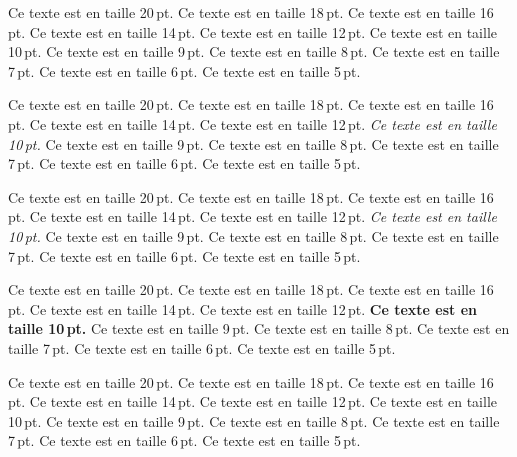 {\obeylines
{}\nopagebreak
{\twentyrm \fontss Ce texte est en taille 20\,pt.}
{\eighteenrm \fontss Ce texte est en taille 18\,pt.}
{\sixteenrm \fontss Ce texte est en taille 16\,pt.}
{\fourteenrm \fontss Ce texte est en taille 14\,pt.}
{\twelverm \fontss Ce texte est en taille 12\,pt.}
{\rm \fontss Ce texte est en taille 10\,pt.}
{\ninerm \fontss Ce texte est en taille 9\,pt.}
{\eightrm \fontss Ce texte est en taille 8\,pt.}
{\sevenrm \fontss Ce texte est en taille 7\,pt.}
{\sixrm \fontss Ce texte est en taille 6\,pt.}
{\fiverm \fontss Ce texte est en taille 5\,pt.}
\

\nopagebreak
{\twentyit \fontss Ce texte est en taille 20\,pt.}
{\eighteenit \fontss Ce texte est en taille 18\,pt.}
{\sixteenit \fontss Ce texte est en taille 16\,pt.}
{\fourteenit \fontss Ce texte est en taille 14\,pt.}
{\twelveit \fontss Ce texte est en taille 12\,pt.}
{\it \fontss Ce texte est en taille 10\,pt.}
{\nineit \fontss Ce texte est en taille 9\,pt.}
{\eightit \fontss Ce texte est en taille 8\,pt.}
{\sevenit \fontss Ce texte est en taille 7\,pt.}
{\sixit \fontss Ce texte est en taille 6\,pt.}
{\fiveit \fontss Ce texte est en taille 5\,pt.}
\

\nopagebreak
{\twentysl \fontss Ce texte est en taille 20\,pt.}
{\eighteensl \fontss Ce texte est en taille 18\,pt.}
{\sixteensl \fontss Ce texte est en taille 16\,pt.}
{\fourteensl \fontss Ce texte est en taille 14\,pt.}
{\twelvesl \fontss Ce texte est en taille 12\,pt.}
{\sl \fontss Ce texte est en taille 10\,pt.}
{\ninesl \fontss Ce texte est en taille 9\,pt.}
{\eightsl \fontss Ce texte est en taille 8\,pt.}
{\sevensl \fontss Ce texte est en taille 7\,pt.}
{\sixsl \fontss Ce texte est en taille 6\,pt.}
{\fivesl \fontss Ce texte est en taille 5\,pt.}
\

\newpage
{}\nopagebreak
{\twentybf \fontss Ce texte est en taille 20\,pt.}
{\eighteenbf \fontss Ce texte est en taille 18\,pt.}
{\sixteenbf \fontss Ce texte est en taille 16\,pt.}
{\fourteenbf \fontss Ce texte est en taille 14\,pt.}
{\twelvebf \fontss Ce texte est en taille 12\,pt.}
{\bf \fontss Ce texte est en taille 10\,pt.}
{\ninebf \fontss Ce texte est en taille 9\,pt.}
{\eightbf \fontss Ce texte est en taille 8\,pt.}
{\sevenbf \fontss Ce texte est en taille 7\,pt.}
{\sixbf \fontss Ce texte est en taille 6\,pt.}
{\fivebf \fontss Ce texte est en taille 5\,pt.}
\

\nopagebreak
{\twentyitbf \fontss Ce texte est en taille 20\,pt.}
{\eighteenitbf \fontss Ce texte est en taille 18\,pt.}
{\sixteenitbf \fontss Ce texte est en taille 16\,pt.}
{\fourteenitbf \fontss Ce texte est en taille 14\,pt.}
{\twelveitbf \fontss Ce texte est en taille 12\,pt.}
{\itbf \fontss Ce texte est en taille 10\,pt.}
{\nineitbf \fontss Ce texte est en taille 9\,pt.}
{\eightitbf \fontss Ce texte est en taille 8\,pt.}
{\sevenitbf \fontss Ce texte est en taille 7\,pt.}
{\sixitbf \fontss Ce texte est en taille 6\,pt.}
{\fiveitbf \fontss Ce texte est en taille 5\,pt.}
\

}
